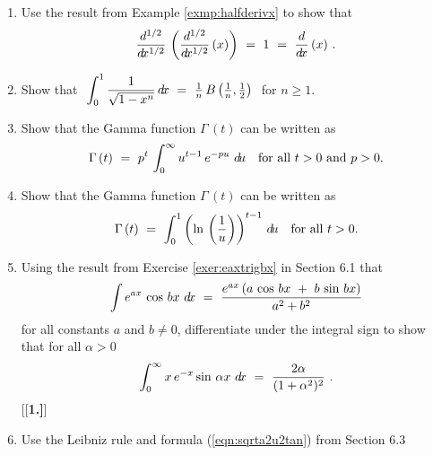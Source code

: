 {\begin{enumerate}[\bfseries 1.]
  \ref{exer:intsinmcosn} above, to show that for $m=1$, $2$, $3$, $\ldots$,
\[
\int_0^{\pi/2} \sin^{2m}\theta~\dtheta ~=~
\frac{\sqrt{\pi}\;\Gamma\,\left(m + \frac{1}{2}\right)}{2\,(m!)} \qquad\text{and}\qquad
\int_0^{\pi/2} \sin^{2m+1}\theta~\dtheta ~=~
\frac{\sqrt{\pi}\;(m!)}{2\,\Gamma\,\left(m + \frac{3}{2}\right)} ~.
\]
\newpage
{}
 \item Use the result from Example \ref{exmp:halfderivx} to show that
\[
\frac{d^{1/2}}{d\!x^{1/2}}\,\left(\frac{d^{1/2}}{d\!x^{1/2}}\,(x)\right) ~=~ 1 ~=~
\frac{d}{d\!x}\,(x) ~.
\]
 \item Show that $~\displaystyle\int_0^1 \dfrac{1}{\sqrt{1 - x^n}}\,d\!x ~=~ 
  \tfrac{1}{n}\,B\left(\tfrac{1}{n},\tfrac{1}{2}\right)~$ for $n \ge 1$.
 \item Show that the Gamma function $\Gamma\,(t)$ can be written as
\[
\Gamma\,(t) ~=~ p^t\,\int_0^{\infty} u^{t-1} \,e^{-pu}~d\!u
 \quad\text{for all $t > 0$ and $p > 0$.}
\]
 \item Show that the Gamma function $\Gamma\,(t)$ can be written as
\[
\Gamma\,(t) ~=~ \int_0^1 \left(\ln\,\left(\frac{1}{u}\right)\right)^{t-1}\,d\!u
 \quad\text{for all $t > 0$.}
\]
 \item Using the result from Exercise \ref{exer:eaxtrigbx}  in Section 6.1 that
\[
\int e^{ax}\,\cos\,bx~d\!x ~=~ \frac{e^{ax}\,(a\,\cos\,bx ~+~ b\,\sin\,bx)}{a^2 + b^2}
\]
for all constants $a$ and $b \ne 0$, differentiate under the integral sign to
show that for all $\alpha > 0$
\[
\int_0^{\infty} x\,e^{-x} \sin\,\alpha x~d\!x ~=~ \frac{2 \alpha}{(1 + \alpha^2)^2} ~.
\]
[{[\bfseries 1.]}]
 \item Use the Leibniz rule and formula (\ref{eqn:sqrta2u2tan}) from Section 6.3

\end{enumerate}}
